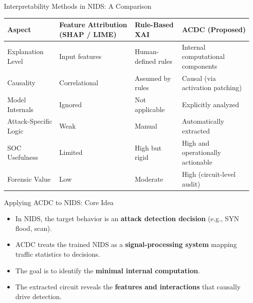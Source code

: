 \documentclass{beamer}
\begin{document}
	\begin{frame}{Interpretability Methods in NIDS: A Comparison}
		\centering
		\scriptsize
		\renewcommand{\arraystretch}{1.75}
		
		\begin{tabular}{@{}p{2cm} p{2.5cm} p{2.1cm} p{3cm}@{}}
			\toprule
			\centering\textbf{Aspect} &
			\centering\textbf{Feature Attribution {\tiny (SHAP / LIME)}} &
			\centering\textbf{Rule-Based XAI} &
			\textbf{ACDC (Proposed)} \\
			\midrule
			
			Explanation Level &
			Input features &
			Human-defined rules &
			Internal computational components \\
			
			Causality &
			Correlational &
			Assumed by rules &
			Causal (via activation patching) \\
			
			Model Internals &
			Ignored &
			Not applicable &
			Explicitly analyzed \\
			
			Attack-Specific Logic &
			Weak &
			Manual &
			Automatically extracted \\
			
			SOC Usefulness &
			Limited &
			High but rigid &
			High and operationally actionable \\
			
			Forensic Value &
			Low &
			Moderate &
			High (circuit-level audit) \\
			
			\bottomrule
		\end{tabular}
	\end{frame}
	
	\begin{frame}{Applying ACDC to NIDS: Core Idea}
		\begin{itemize}
			\item In NIDS, the target behavior is an \textbf{attack detection decision}
			(e.g., SYN flood, scan). 
			
			\item \justifying ACDC treats the trained NIDS as a \textbf{signal-processing system}
			mapping traffic statistics to decisions.
			
			\item\justifying The goal is to identify the \textbf{minimal internal computation}.
			
			\item\justifying The extracted circuit reveals the \textbf{features and interactions}
			that causally drive detection. \tiny\cite{conmy2023acdc,lyle2023efficient}
			
		\end{itemize}
		
	\end{frame}
	
\end{document}
